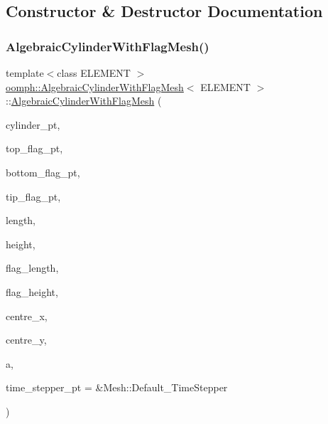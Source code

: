 \subsection{Constructor \& Destructor Documentation}
\mbox{\label{classoomph_1_1AlgebraicCylinderWithFlagMesh_a2c307b804fee56aa620ea414b41883d5}} 
\subsubsection{\texorpdfstring{Algebraic\+Cylinder\+With\+Flag\+Mesh()}{AlgebraicCylinderWithFlagMesh()}}
{\footnotesize\ttfamily template$<$class E\+L\+E\+M\+E\+NT $>$ \\
\hyperlink{classoomph_1_1AlgebraicCylinderWithFlagMesh}{oomph\+::\+Algebraic\+Cylinder\+With\+Flag\+Mesh}$<$ E\+L\+E\+M\+E\+NT $>$\+::\hyperlink{classoomph_1_1AlgebraicCylinderWithFlagMesh}{Algebraic\+Cylinder\+With\+Flag\+Mesh} (\begin{DoxyParamCaption}\item[{Circle $\ast$}]{cylinder\+\_\+pt,  }\item[{Geom\+Object $\ast$}]{top\+\_\+flag\+\_\+pt,  }\item[{Geom\+Object $\ast$}]{bottom\+\_\+flag\+\_\+pt,  }\item[{Geom\+Object $\ast$}]{tip\+\_\+flag\+\_\+pt,  }\item[{const double \&}]{length,  }\item[{const double \&}]{height,  }\item[{const double \&}]{flag\+\_\+length,  }\item[{const double \&}]{flag\+\_\+height,  }\item[{const double \&}]{centre\+\_\+x,  }\item[{const double \&}]{centre\+\_\+y,  }\item[{const double \&}]{a,  }\item[{Time\+Stepper $\ast$}]{time\+\_\+stepper\+\_\+pt = {\ttfamily \&Mesh\+:\+:Default\+\_\+TimeStepper} }\end{DoxyParamCaption})\hspace{0.3cm}{\ttfamily [inline]}}




